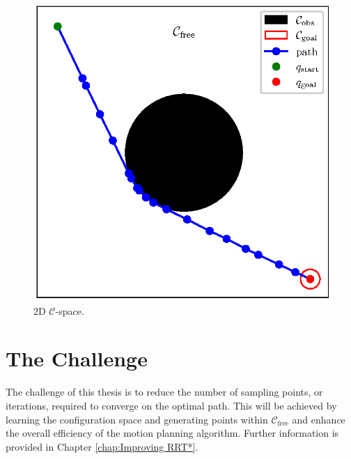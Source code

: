\documentclass{ctuthesis}
\begin{document}
\begin{figure}
  \centering
  \includegraphics[width=0.6\linewidth]{figChap2/ConfigSpace.eps}
  \caption{2D $\mathcal{C}$-space.}
  \label{fig:config_space} 
\end{figure} 
\section{The Challenge}

The challenge of this thesis is to reduce the number of 
sampling points, or iterations, 
required to converge on the optimal path. 
This will be achieved by learning 
the configuration space and generating points within $\mathcal{C}_{\text{free}}$ 
and enhance the overall efficiency of the motion planning algorithm. 
Further information is provided in Chapter \ref{chap:Improving RRT*}.
 
\end{document}
